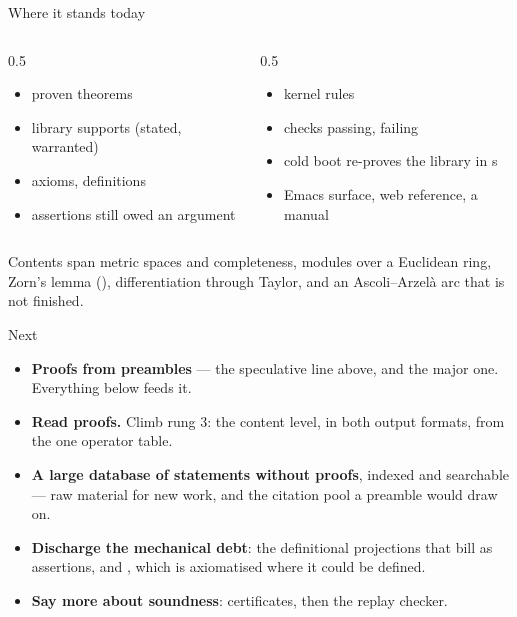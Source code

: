 \documentclass[11pt,aspectratio=169]{beamer}
\begin{document}
\begin{frame}{Where it stands today}
  \begin{columns}[T]
    \begin{column}{0.5\textwidth}
      \begin{itemize}
        \item \Nproven{} proven theorems
        \item \Nsupport{} library supports (stated, warranted)
        \item \Naxioms{} axioms, \Ndefs{} definitions
        \item \Nassert{} assertions still owed an argument
      \end{itemize}
    \end{column}
    \begin{column}{0.5\textwidth}
      \begin{itemize}
        \item \Nkernel{} kernel rules
        \item \Nsuite{} checks passing, \Nsuitefail{} failing
        \item cold boot re-proves the library in \Nload{} s
        \item Emacs surface, web reference, a manual
      \end{itemize}
    \end{column}
  \end{columns}
  \vfill
  \small Contents span metric spaces and completeness, modules over a
  Euclidean ring, Zorn's lemma (), differentiation through
  Taylor, and an Ascoli--Arzel\`a arc that is not finished.
\end{frame}

\begin{frame}{Next}
  \begin{itemize}
    \item \textbf{Proofs from preambles} --- the speculative line above, and
          the major one. Everything below feeds it.
    \item \textbf{Read proofs.} Climb rung 3: the content level, in both output
          formats, from the one operator table.
    \item \textbf{A large database of statements without proofs}, indexed and
          searchable --- raw material for new work, and the citation pool a
          preamble would draw on.
    \item \textbf{Discharge the mechanical debt}: the definitional projections
          that bill as assertions, and , which is axiomatised where
          it could be defined.
    \item \textbf{Say more about soundness}: certificates, then the replay
          checker.
  \end{itemize}
\end{frame}
\end{document}

